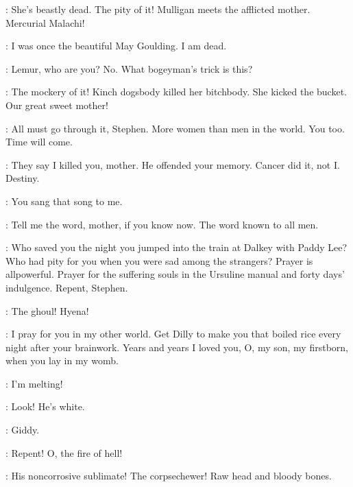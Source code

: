 \BuckMulligan:
She's beastly dead.
The pity of it!
Mulligan meets the afflicted mother.
Mercurial Malachi!

\Mother:
I was once the beautiful May Goulding.
I am dead.

\Stephen:
Lemur, who are you?
No. What bogeyman's trick is this?

\BuckMulligan:
The mockery of it!
Kinch dogsbody killed her bitchbody.
She kicked the bucket.
Our great sweet mother!

\Mother:
All must go through it, Stephen.
More women than men in the world.
You too.
Time will come.

\Stephen:
They say I killed you, mother.
He offended your memory.
Cancer did it, not I.
Destiny.

\Mother:
You sang that song to me.

\Stephen:
Tell me the word, mother, if you know now.
The word known to all men.

\Mother:
Who saved you the night you jumped into the train at Dalkey with Paddy Lee?
Who had pity for you when you were sad among the strangers?
Prayer is allpowerful.
Prayer for the suffering souls in the Ursuline manual and forty days' indulgence.
Repent, Stephen.

\Stephen:
The ghoul!
Hyena!

\Mother:
I pray for you in my other world.
Get Dilly to make you that boiled rice every night after your brainwork.
Years and years I loved you, O, my son, my firstborn, when you lay in my womb.

\Zoe:
I'm melting!

\Florry:
Look!
He's white.

\Bloom:
Giddy.

\Mother:
Repent!
O, the fire of hell!

\Stephen:
His noncorrosive sublimate!
The corpsechewer!
Raw head and bloody bones.

